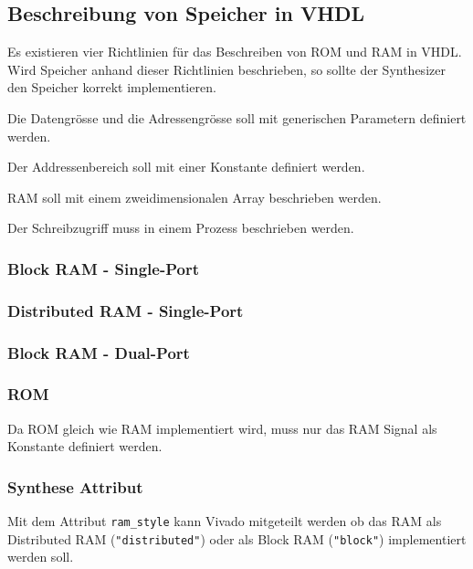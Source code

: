 \subsection{Beschreibung von Speicher in VHDL}
Es existieren vier Richtlinien für das Beschreiben von ROM und RAM in VHDL. Wird Speicher anhand dieser Richtlinien beschrieben, so sollte der Synthesizer den Speicher korrekt implementieren.
\begin{compactenum}
    \item Die Datengrösse und die Adressengrösse soll mit generischen Parametern definiert werden.
    \item Der Addressenbereich soll mit einer Konstante definiert werden.
    \item RAM soll mit einem zweidimensionalen Array beschrieben werden.
    \item Der Schreibzugriff muss in einem Prozess beschrieben werden.
\end{compactenum}

\subsubsection{Block RAM - Single-Port}


\subsubsection{Distributed RAM - Single-Port}


\subsubsection{Block RAM - Dual-Port}


\subsubsection{ROM}
Da ROM gleich wie RAM implementiert wird, muss nur das RAM Signal als Konstante definiert werden.


\subsubsection{Synthese Attribut}
Mit dem Attribut \texttt{ram\_style} kann Vivado mitgeteilt werden ob das RAM als Distributed RAM (\texttt{"distributed"}) oder als Block RAM (\texttt{"block"}) implementiert werden soll.


